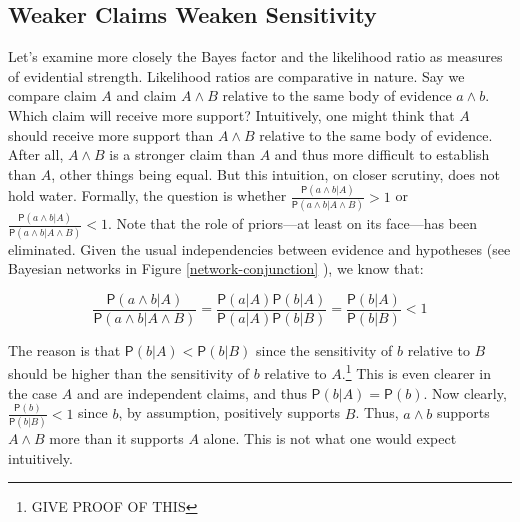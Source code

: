 \documentclass[10pt,dvipsnames,enabledeprecatedfontcommands]{scrartcl}
\newcommand{\pr}[1]{\mathsf{P}(#1)}
\begin{document}
\hypertarget{weaker-claims-weaken-sensitivity}{%
\subsection{Weaker Claims Weaken
Sensitivity}\label{weaker-claims-weaken-sensitivity}}

Let's examine more closely the Bayes factor and the likelihood ratio as
measures of evidential strength. Likelihood ratios are comparative in
nature. Say we compare claim \(A\) and claim \(A\wedge B\) relative to
the same body of evidence \(a\wedge b\). Which claim will receive more
support? Intuitively, one might think that \(A\) should receive more
support than \(A\wedge B\) relative to the same body of evidence. After
all, \(A\wedge B\) is a stronger claim than \(A\) and thus more
difficult to establish than \(A\), other things being equal. But this
intuition, on closer scrutiny, does not hold water. Formally, the
question is whether
\(\frac{\pr{a\wedge b \vert A}}{\pr{a\wedge b \vert A \wedge B}}>1\) or
\(\frac{\pr{a\wedge b \vert A}}{\pr{a\wedge b \vert A \wedge B}}<1\).
Note that the role of priors---at least on its face---has been
eliminated. Given the usual independencies between evidence and
hypotheses (see Bayesian networks in Figure \ref{network-conjunction} ),
we know that:

\[\frac{\pr{a\wedge b \vert A}}{\pr{a\wedge b \vert A \wedge B}}=\frac{\pr{a \vert A} \pr{b \vert A}}{\pr{a \vert A} \pr{b \vert B}}=\frac{\pr{b \vert A}}{\pr{b \vert B}}<1\]

\noindent The reason is that \(\pr{b \vert A} < \pr{b \vert B}\) since
the sensitivity of \(b\) relative to \(B\) should be higher than the
sensitivity of \(b\) relative to \(A\).\footnote{GIVE PROOF OF THIS}
This is even clearer in the case \(A\) and are independent claims, and
thus \(\pr{b \vert A}=\pr{b}\). Now clearly,
\(\frac{\pr{b}}{\pr{b \vert B}}<1\) since \(b\), by assumption,
positively supports \(B\). Thus, \(a\wedge b\) supports \(A\wedge B\)
more than it supports \(A\) alone. This is not what one would expect
intuitively.
\end{document}
